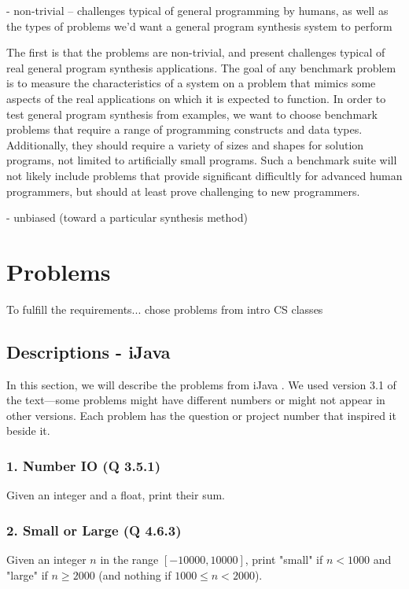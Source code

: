\documentclass{sig-alternate}
\begin{document}
- non-trivial -- challenges typical of general programming by humans, as well as the types of problems we’d want a general program synthesis system to perform

The first is that the problems are non-trivial, and present challenges typical of real general program synthesis applications. The goal of any benchmark problem is to measure the characteristics of a system on a problem that mimics some aspects of the real applications on which it is expected to function. In order to test general program synthesis from examples, we want to choose benchmark problems that require a range of programming constructs and data types. Additionally, they should require a variety of sizes and shapes for solution programs, not limited to artificially small programs. Such a benchmark suite will not likely include problems that provide significant difficultly for advanced human programmers, but should at least prove challenging to new programmers.

- unbiased (toward a particular synthesis method)




\section{Problems}
To fulfill the requirements... chose problems from intro CS classes



\subsection{Descriptions - iJava}

In this section, we will describe the problems from iJava \cite{iJava, Moll:2011:IOI:1968521.1968535}. We used version 3.1 of the text---some problems might have different numbers or might not appear in other versions. Each problem has the question or project number that inspired it beside it.

\subsubsection*{1. Number IO (Q 3.5.1)}
Given an integer and a float, print their sum.

\subsubsection*{2. Small or Large (Q 4.6.3)}
Given an integer $n$ in the range $[-10000, 10000]$, print "small" if $n < 1000$ and "large" if $n \ge 2000$ (and nothing if $1000 \le n < 2000$).
\end{document}
